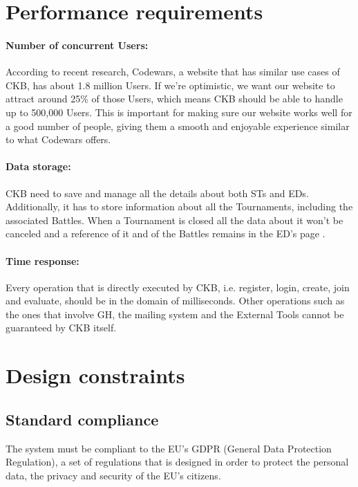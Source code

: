 \section{Performance requirements}
\label{sec:performance_requirements}%
\paragraph{Number of concurrent Users:} According to recent research, Codewars, a website that has similar use cases of CKB, has about 1.8 million Users. If we're optimistic, we want our website to attract around 25\% of those Users, which means CKB should be able to handle up to 500,000 Users. This is important for making sure our website works well for a good number of people, giving them a smooth and enjoyable experience similar to what Codewars offers.
\paragraph{Data storage:} CKB need to save and manage all the details about both STs and EDs. Additionally, it has to store information about all the Tournaments, including the associated Battles. When a Tournament is closed all the data about it won’t be canceled and a reference of it and of the Battles remains in the ED’s page .
\paragraph{Time response:} Every operation that is directly executed by CKB, i.e. register, login, create, join and evaluate, should be in the domain of milliseconds. Other operations such as the ones that involve GH, the mailing system and the External Tools cannot be guaranteed by CKB itself.



\section{Design constraints}
\label{sec:design_constraints}%


\subsection{Standard compliance}
\label{subsec:standard compliance}%
The system must be compliant to the EU's GDPR (General Data Protection Regulation), a set of regulations that is designed in order to protect the personal data, the privacy and security of the EU's citizens. 



